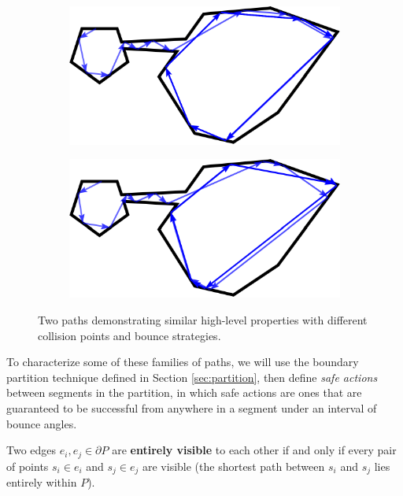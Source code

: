 \documentclass[]{styles/svproc}  %
\begin{document}
\begin{figure}
\centering
\begin{subfigure}{0.5\textwidth}
\includegraphics[width=\linewidth]{figures/twoc_a}
\end{subfigure}%
\begin{subfigure}{0.5\textwidth}
\includegraphics[width=\linewidth]{figures/twoc_b}
\end{subfigure}
\caption{Two paths demonstrating similar high-level properties with different
collision points and bounce strategies.}
\label{fig:twopaths}
\end{figure}

To characterize some of these families of paths, we will use the boundary
partition technique defined in Section \ref{sec:partition}, then define
\emph{safe actions} between segments in the partition, in which safe actions are
ones that are guaranteed to be successful from anywhere in a segment under an
interval of bounce angles.

\begin{definition}
Two edges $e_i,e_j \in \partial P$ are \textbf{entirely visible} to each other if
and only if every pair of points $s_i \in e_i$ and $s_j \in e_j$ are visible (the
shortest path between $s_i$ and $s_j$ lies entirely within $P$).
\end{definition}
\end{document}
